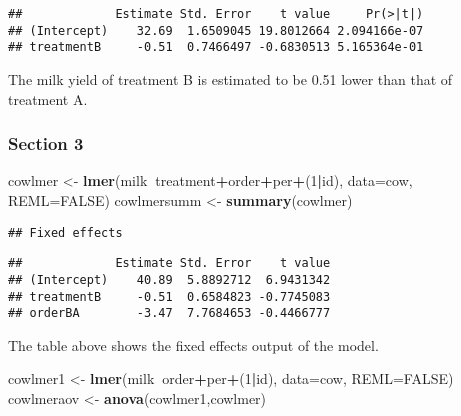 \documentclass[]{article}
\newenvironment{Shaded}{\begin{snugshade}}{\end{snugshade}}
\newcommand{\KeywordTok}[1]{\textcolor[rgb]{0.13,0.29,0.53}{\textbf{#1}}}
\newcommand{\DataTypeTok}[1]{\textcolor[rgb]{0.13,0.29,0.53}{#1}}
\newcommand{\DecValTok}[1]{\textcolor[rgb]{0.00,0.00,0.81}{#1}}
\newcommand{\StringTok}[1]{\textcolor[rgb]{0.31,0.60,0.02}{#1}}
\newcommand{\OtherTok}[1]{\textcolor[rgb]{0.56,0.35,0.01}{#1}}
\newcommand{\OperatorTok}[1]{\textcolor[rgb]{0.81,0.36,0.00}{\textbf{#1}}}
\newcommand{\NormalTok}[1]{#1}
\begin{document}
\begin{verbatim}
##             Estimate Std. Error    t value     Pr(>|t|)
## (Intercept)    32.69  1.6509045 19.8012664 2.094166e-07
## treatmentB     -0.51  0.7466497 -0.6830513 5.165364e-01
\end{verbatim}

The milk yield of treatment B is estimated to be 0.51 lower than that of
treatment A.

\subsubsection{Section 3}\label{section-3-1}

\begin{Shaded}
\begin{Highlighting}[]
\NormalTok{cowlmer <-}\StringTok{ }\KeywordTok{lmer}\NormalTok{(milk}\OperatorTok{~}\NormalTok{treatment}\OperatorTok{+}\NormalTok{order}\OperatorTok{+}\NormalTok{per}\OperatorTok{+}\NormalTok{(}\DecValTok{1}\OperatorTok{|}\NormalTok{id), }\DataTypeTok{data=}\NormalTok{cow, }\DataTypeTok{REML=}\OtherTok{FALSE}\NormalTok{)}
\NormalTok{cowlmersumm <-}\StringTok{ }\KeywordTok{summary}\NormalTok{(cowlmer)}
\end{Highlighting}
\end{Shaded}

\begin{verbatim}
## Fixed effects
\end{verbatim}

\begin{verbatim}
##             Estimate Std. Error    t value
## (Intercept)    40.89  5.8892712  6.9431342
## treatmentB     -0.51  0.6584823 -0.7745083
## orderBA        -3.47  7.7684653 -0.4466777
\end{verbatim}

The table above shows the fixed effects output of the model.

\begin{Shaded}
\begin{Highlighting}[]
\NormalTok{cowlmer1 <-}\StringTok{ }\KeywordTok{lmer}\NormalTok{(milk}\OperatorTok{~}\NormalTok{order}\OperatorTok{+}\NormalTok{per}\OperatorTok{+}\NormalTok{(}\DecValTok{1}\OperatorTok{|}\NormalTok{id), }\DataTypeTok{data=}\NormalTok{cow, }\DataTypeTok{REML=}\OtherTok{FALSE}\NormalTok{)}
\NormalTok{cowlmeraov <-}\StringTok{ }\KeywordTok{anova}\NormalTok{(cowlmer1,cowlmer)}
\end{Highlighting}
\end{Shaded}
\end{document}
